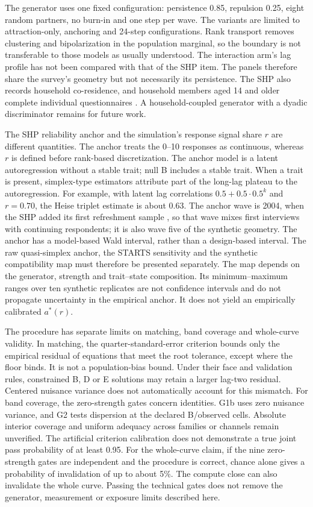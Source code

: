 The generator uses one fixed configuration: persistence 0.85, repulsion 0.25, eight random partners, no burn-in and one step per wave. The variants are limited to attraction-only, anchoring and 24-step configurations. Rank transport removes clustering and bipolarization in the population marginal, so the boundary is not transferable to those models as usually understood. The interaction arm's lag profile has not been compared with that of the SHP item. The panels therefore share the survey's geometry but not necessarily its persistence. The SHP also records household co-residence, and household members aged 14 and older complete individual questionnaires \cite{voorpostel2025shp}. A household-coupled generator with a dyadic discriminator remains for future work.

The SHP reliability anchor and the simulation's response signal share $r$ are different quantities. The anchor treats the 0--10 responses as continuous, whereas $r$ is defined before rank-based discretization. The anchor model is a latent autoregression without a stable trait; null B includes a stable trait. When a trait is present, simplex-type estimators attribute part of the long-lag plateau to the autoregression. For example, with latent lag correlations $0.5+0.5\cdot0.5^k$ and $r=0.70$, the Heise triplet estimate is about 0.63. The anchor wave is 2004, when the SHP added its first refreshment sample \cite{voorpostel2025shp}, so that wave mixes first interviews with continuing respondents; it is also wave five of the synthetic geometry. The anchor has a model-based Wald interval, rather than a design-based interval. The raw quasi-simplex anchor, the STARTS sensitivity and the synthetic compatibility map must therefore be presented separately. %
The map depends on the generator, strength and trait--state composition. Its minimum--maximum ranges over ten synthetic replicates are not confidence intervals and do not propagate uncertainty in the empirical anchor. %
It does not yield an empirically calibrated $a^*(r)$. %

The procedure has separate limits on matching, band coverage and whole-curve validity. In matching, the quarter-standard-error criterion bounds only the empirical residual of equations that meet the root tolerance, except where the floor binds. It is not a population-bias bound. Under their face and validation rules, constrained B, D or E solutions may retain a larger lag-two residual. Centered nuisance variance does not automatically account for this mismatch. For band coverage, the zero-strength gates concern identities. G1b uses zero nuisance variance, and G2 tests dispersion at the declared B/observed cells. Absolute interior coverage and uniform adequacy across families or channels remain unverified. The artificial criterion calibration does not demonstrate a true joint pass probability of at least 0.95. For the whole-curve claim, if the nine zero-strength gates are independent and the procedure is correct, chance alone gives a probability of invalidation of up to about 5\%. The compute close can also invalidate the whole curve. Passing the technical gates does not remove the generator, measurement or exposure limits described here.

